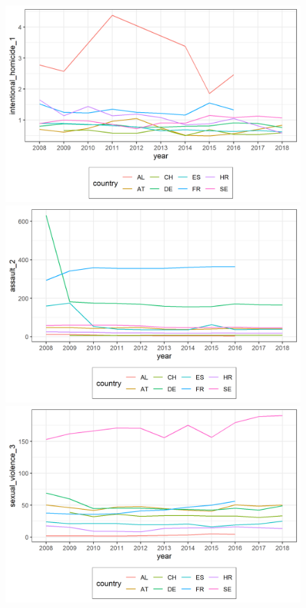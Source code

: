 \documentclass[a4paper,12pt]{article}
\begin{document}
\begin{figure}[!h]

\begin{minipage}{0.45\textwidth}
  \includegraphics[trim={0 0 0 0},width=\linewidth]{charts/des_line_intentional_homicide_1_.png}
\end{minipage}
\begin{minipage}{0.45\textwidth}
  \includegraphics[trim={0 0 0 0},width=\linewidth]{charts/des_line_assault_2_.png}
\end{minipage}
\begin{minipage}{0.45\textwidth}
  \includegraphics[trim={0 0 0 0},width=\linewidth]{charts/des_line_sexual_violence_3_.png}

\end{minipage}
\end{figure}
\end{document}
